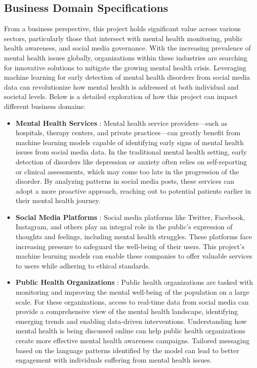 \subsection{Business Domain Specifications}
\noindent
From a business perspective, this project holds significant value across various sectors, particularly those that intersect with mental health monitoring, public health awareness, and social media governance. With the increasing prevalence of mental health issues globally, organizations within these industries are searching for innovative solutions to mitigate the growing mental health crisis. Leveraging machine learning for early detection of mental health disorders from social media data can revolutionize how mental health is addressed at both individual and societal levels. Below is a detailed exploration of how this project can impact different business domains:

\begin{itemize}
    
    \item \textbf{Mental Health Services} :
    \noindent
    Mental health service providers—such as hospitals, therapy centers, and private practices—can greatly benefit from machine learning models capable of identifying early signs of mental health issues from social media data. In the traditional mental health setting, early detection of disorders like depression or anxiety often relies on self-reporting or clinical assessments, which may come too late in the progression of the disorder. By analyzing patterns in social media posts, these services can adopt a more proactive approach, reaching out to potential patients earlier in their mental health journey.

    \item \textbf{Social Media Platforms} :
    \noindent
    Social media platforms like Twitter, Facebook, Instagram, and others play an integral role in the public’s expression of thoughts and feelings, including mental health struggles. These platforms face increasing pressure to safeguard the well-being of their users. This project’s machine learning models can enable these companies to offer valuable services to users while adhering to ethical standards.

    \item \textbf{Public Health Organizations} :
    \noindent
    Public health organizations are tasked with monitoring and improving the mental well-being of the population on a large scale. For these organizations, access to real-time data from social media can provide a comprehensive view of the mental health landscape, identifying emerging trends and enabling data-driven interventions. Understanding how mental health is being discussed online can help public health organizations create more effective mental health awareness campaigns. Tailored messaging based on the language patterns identified by the model can lead to better engagement with individuals suffering from mental health issues.
    
\end{itemize}

